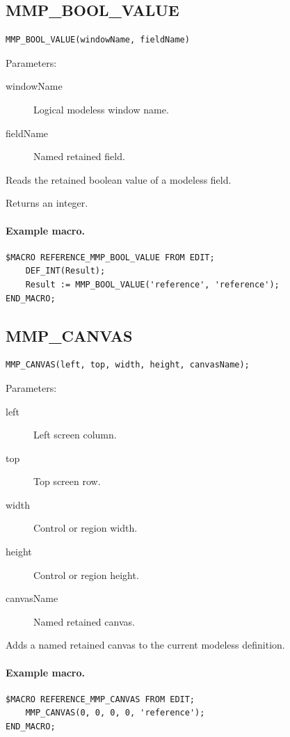 \documentclass[a4paper,10pt,twoside,openany]{book}
\newenvironment{mrmacextension}{\begin{changebar}}{\end{changebar}}
\begin{document}
\begin{mrmacextension}
\label{prim:intrinsic-mmp-bool-value}
\subsection*{MMP\_BOOL\_VALUE}
\begin{verbatim}
MMP_BOOL_VALUE(windowName, fieldName)
\end{verbatim}
Parameters:
\begin{description}
\item[windowName] Logical modeless window name.
\item[fieldName] Named retained field.
\end{description}

Reads the retained boolean value of a modeless field.

Returns an integer.

\paragraph{Example macro.}
\begin{verbatim}
$MACRO REFERENCE_MMP_BOOL_VALUE FROM EDIT;
    DEF_INT(Result);
    Result := MMP_BOOL_VALUE('reference', 'reference');
END_MACRO;
\end{verbatim}
\end{mrmacextension}

\begin{mrmacextension}
\label{prim:procedure-mmp-canvas}
\subsection*{MMP\_CANVAS}
\begin{verbatim}
MMP_CANVAS(left, top, width, height, canvasName);
\end{verbatim}
Parameters:
\begin{description}
\item[left] Left screen column.
\item[top] Top screen row.
\item[width] Control or region width.
\item[height] Control or region height.
\item[canvasName] Named retained canvas.
\end{description}

Adds a named retained canvas to the current modeless definition.

\paragraph{Example macro.}
\begin{verbatim}
$MACRO REFERENCE_MMP_CANVAS FROM EDIT;
    MMP_CANVAS(0, 0, 0, 0, 'reference');
END_MACRO;
\end{verbatim}
\end{mrmacextension}
\end{document}

